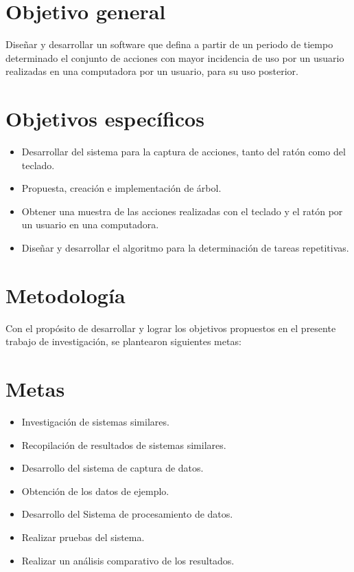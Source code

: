 \section{Objetivo general} 
Diseñar y desarrollar un software que defina a partir de un periodo de tiempo
 determinado el conjunto de acciones con mayor incidencia de uso por un usuario
 realizadas en una computadora por un usuario, para su uso posterior.

\section{Objetivos específicos}
\begin{itemize}
  \item Desarrollar del sistema para la captura de acciones, tanto del  ratón
  como del teclado.
  \item Propuesta, creación e implementación de árbol.
  \item Obtener una muestra de las acciones realizadas con el teclado y el 
  ratón por un usuario en una computadora.
  \item Diseñar y desarrollar el algoritmo para la determinación de tareas
  repetitivas.
\end{itemize}


\section{Metodología}
Con el propósito de desarrollar y lograr los objetivos propuestos en el presente trabajo de investigación, se plantearon siguientes metas:
\section*{Metas}
\begin{itemize}
  \item Investigación de sistemas similares.
  \item Recopilación de resultados de sistemas similares.
  \item Desarrollo del sistema  de captura de datos.
  \item Obtención de los datos de ejemplo.
  \item Desarrollo del Sistema de procesamiento de datos.
  \item Realizar pruebas del sistema.
  \item Realizar un análisis comparativo de los resultados.
\end{itemize}